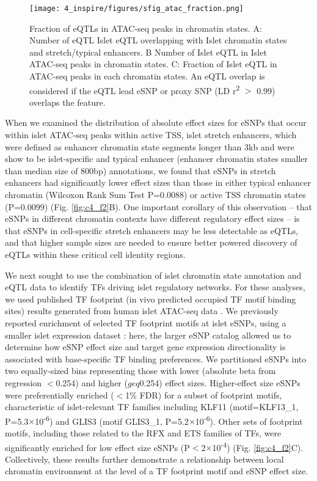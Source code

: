 \begin{figure}
    \centering
    \texttt{[image: 4\_inspire/figures/sfig\_atac\_fraction.png]}
    \caption[Fraction of eQTLs in ATAC-seq peaks in chromatin states]{Fraction of eQTLs in ATAC-seq peaks in chromatin states. A: Number of eQTL Islet eQTL overlapping with Islet chromatin states and stretch/typical enhancers. B Number of Islet eQTL in Islet ATAC-seq peaks in chromatin states. C: Fraction of Islet eQTL in ATAC-seq peaks in each chromatin states. An eQTL overlap is considered if the eQTL lead eSNP or proxy SNP (LD r\textsuperscript{2} $>$ 0.99) overlaps the feature.}
    \label{fig:c4_sf_atac_fraction}
\end{figure}

When we examined the distribution of absolute effect sizes for eSNPs that occur within islet ATAC-seq peaks within active TSS, islet stretch enhancers, which were defined as enhancer chromatin state segments longer than 3kb and were show to be islet-specific \cite{parkerChromatinStretchEnhancer2013} and typical enhancer (enhancer chromatin states smaller than median size of 800bp) annotations, we found that eSNPs in stretch enhancers had significantly lower effect sizes than those in either typical enhancer chromatin (Wilcoxon Rank Sum Test P=0.0088) or active TSS chromatin states (P=0.0099) (Fig. \ref{fig:c4_f2}B). One important corollary of this observation – that eSNPs in different chromatin contexts have different regulatory effect sizes – is that eSNPs in cell-specific stretch enhancers may be less detectable as eQTLs, and that higher sample sizes are needed to ensure better powered discovery of eQTLs within these critical cell identity regions.

We next sought to use the combination of islet chromatin state annotation and eQTL data to identify TFs driving islet regulatory networks. For these analyses, we used published TF footprint (in vivo predicted occupied TF motif binding sites) results generated from human islet ATAC-seq data \cite{varshneyGeneticRegulatorySignatures2017}. We previously reported enrichment of selected TF footprint motifs at islet eSNPs, using a smaller islet expression dataset \cite{varshneyGeneticRegulatorySignatures2017}: here, the larger eSNP catalog allowed us to determine how eSNP effect size and target gene expression directionality is associated with base-specific TF binding preferences. We partitioned eSNPs into two equally-sized bins representing those with lower (absolute beta from regression $<$0.254) and higher ($geq$0.254) effect sizes. Higher-effect size eSNPs were preferentially enriched ($<$1\% FDR) for a subset of footprint motifs, characteristic of islet-relevant TF families including KLF11 (motif=KLF13\_1, P=5.3$\times$10\textsuperscript{-6}) and GLIS3 (motif GLIS3\_1, P=5.2$\times$10\textsuperscript{-6}). Other sets of footprint motifs, including those related to the RFX and ETS families of TFs, were significantly enriched for low effect size eSNPs (P$<$2$\times$10\textsuperscript{-4}) (Fig. \ref{fig:c4_f2}C). Collectively, these results further demonstrate a relationship between local chromatin environment at the level of a TF footprint motif and eSNP effect size. 	
 	
